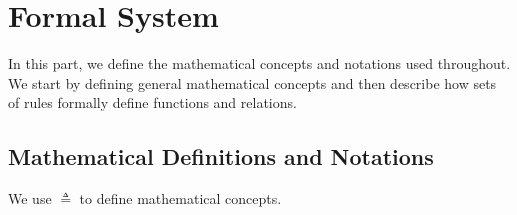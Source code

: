 \chapter{Formal System \label{chap:FormalSystem}}

In this part, we define the mathematical concepts and notations used throughout.
We start by defining general mathematical concepts
and then describe how sets of rules formally define functions and relations.

\section{Mathematical Definitions and Notations}

\hypertarget{def-triangleq}{}
We use $\triangleq$ to define mathematical concepts.

